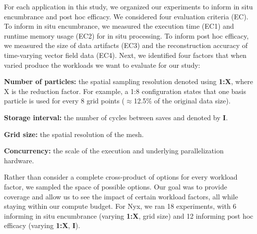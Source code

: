 For each application in this study, we organized our experiments to inform in situ encumbrance and post hoc efficacy. 
%
We considered four evaluation criteria (EC).
%
To inform in situ encumbrance,  we measured the execution time (EC1) and runtime memory usage (EC2) for in situ processing.
%
To inform post hoc efficacy, we measured the size of data artifacts (EC3) and the reconstruction accuracy of time-varying vector field data (EC4).
%
Next, we identified four factors that when varied produce the workloads we want to evaluate for our study:
\begin{tightItemize}
\item\textbf{Number of particles:} the spatial sampling resolution denoted using \textbf{1:X}, where X is the reduction factor. For example, a 1:8 configuration states that one basis particle is used for every 8 grid points ($\approx$12.5\% of the original data size).  
\item\textbf{Storage interval:} the number of cycles between saves and denoted by \textbf{I}.
\item\textbf{Grid size:} the spatial resolution of the mesh. 
\item\textbf{Concurrency:} the scale of the execution and underlying parallelization hardware.
\end{tightItemize}
%
%
Rather than consider a complete cross-product of options for every workload factor, we sampled the space of possible options.
%
Our goal was to provide coverage and allow us to see the impact of certain workload factors, all while staying within our compute budget.
%
For Nyx, we ran 18 experiments, with 6 informing in situ encumbrance (varying \textbf{1:X}, grid size) and 12 informing post hoc efficacy (varying \textbf{1:X}, \textbf{I}).
